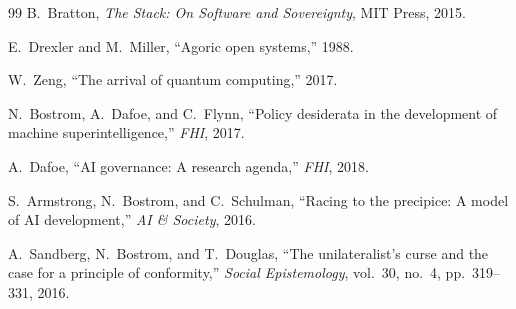 \documentclass[11pt,twocolumn]{article}
\begin{document}
\begin{thebibliography}{99}
 B.~Bratton, \textit{The Stack: On Software and
Sovereignty}, MIT Press, 2015.

 E.~Drexler and M.~Miller, ``Agoric open systems,''
1988.

 W.~Zeng, ``The arrival of quantum computing,'' 2017.

 N.~Bostrom, A.~Dafoe, and C.~Flynn, ``Policy
desiderata in the development of machine superintelligence,'' \textit{FHI},
2017.

 A.~Dafoe, ``AI governance: A research agenda,''
\textit{FHI}, 2018.

 S.~Armstrong, N.~Bostrom, and C.~Schulman,
``Racing to the precipice: A model of AI development,'' \textit{AI \&
Society}, 2016.

 A.~Sandberg, N.~Bostrom, and T.~Douglas,
``The unilateralist's curse and the case for a principle of conformity,''
\textit{Social Epistemology}, vol.~30, no.~4, pp.~319--331, 2016.
\end{thebibliography}
\end{document}
